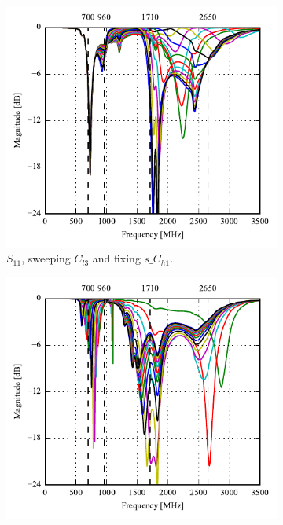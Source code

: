 \begin{figure}[htbp]
   \begin{subfigure}[b]{0.49\linewidth}
        \centering
        \includegraphics{img/tech_sol/nonresonant/simulation/play_mode/s11_top_sweep.pdf}
        \caption{$S_{11}$, sweeping $C_{l3}$ and fixing $s\_C_{h1}$.}
    \end{subfigure}
    \hfill
    \begin{subfigure}[b]{0.49\linewidth}
        \centering
        \includegraphics{img/tech_sol/nonresonant/simulation/play_mode/s22_side_sweep.pdf}

\end{subfigure}
\end{figure}
